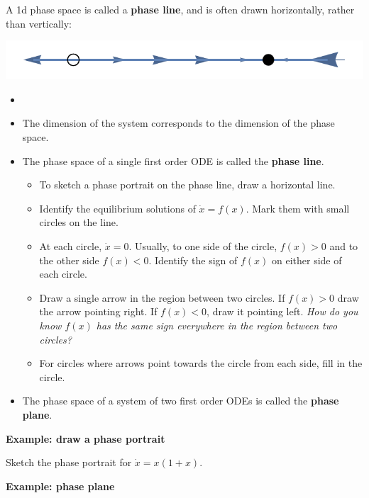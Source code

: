 \documentclass[12pt,letterpaper,noanswers]{exam}
\begin{document}
    A 1d phase space is called a \textbf{phase line}, and is often drawn horizontally, rather than vertically:
    
    \includegraphics[scale=0.65]{img/C34phase1d.pdf}
    
    
    \begin{tcolorbox}
    \begin{itemize}
    \itemsep0em
    \item 
        \item The dimension of the system corresponds to the dimension of the phase space.
        \item The phase space of a single first order ODE is called the \textbf{phase line}.
        \begin{itemize}
        \itemsep0em
            \item To sketch a phase portrait on the phase line, draw a horizontal line.
            \item Identify the equilibrium solutions of $\dot x = f(x)$.  Mark them with small circles on the line.
            \item At each circle, $\dot x = 0$.  Usually, to one side of the circle, $f(x)>0$ and to the other side $f(x)<0$.  Identify the sign of $f(x)$ on either side of each circle.
            \item Draw a single arrow in the region between two circles.  If $f(x) > 0$ draw the arrow pointing right.  If $f(x)<0$, draw it pointing left.  \emph{How do you know $f(x)$ has the same sign everywhere in the region between two circles?}
            \item For circles where arrows point towards the circle from each side, fill in the circle.
        \end{itemize}
        \item The phase space of a system of two first order ODEs is called the \textbf{phase plane}.
    \end{itemize}
    \end{tcolorbox}
  \noindent\textbf{Example: draw a phase portrait}
  
  Sketch the phase portrait for $\dot x = x(1+x)$.
  \vspace{1in}
    
    \noindent\textbf{Example: phase plane}
    
\end{document}
